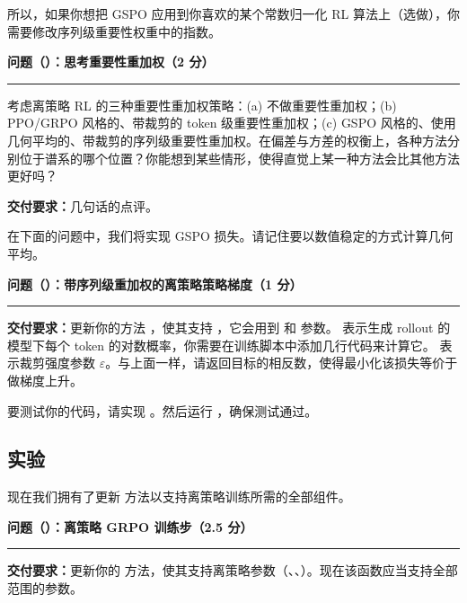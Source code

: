 所以，如果你想把 GSPO 应用到你喜欢的某个常数归一化 RL 算法上（选做），你需要修改序列级重要性权重中的指数。

\medskip
\noindent\textbf{问题（）：思考重要性重加权（2 分）}
\par\nobreak\smallskip\hrule\nobreak\medskip

考虑离策略 RL 的三种重要性重加权策略：(a) 不做重要性重加权；(b) PPO/GRPO 风格的、带裁剪的 token 级重要性重加权；(c) GSPO 风格的、使用几何平均的、带裁剪的序列级重要性重加权。在偏差与方差的权衡上，各种方法分别位于谱系的哪个位置？你能想到某些情形，使得直觉上某一种方法会比其他方法更好吗？

\textbf{交付要求：}几句话的点评。

在下面的问题中，我们将实现 GSPO 损失。请记住要以数值稳定的方式计算几何平均。

\medskip
\noindent\textbf{问题（）：带序列级重加权的离策略策略梯度（1 分）}
\par\nobreak\smallskip\hrule\nobreak\medskip

\textbf{交付要求：}更新你的方法 ，使其支持 ，它会用到  和  参数。 表示生成 rollout 的模型下每个 token 的对数概率，你需要在训练脚本中添加几行代码来计算它。 表示裁剪强度参数 $\varepsilon$。与上面一样，请返回目标的相反数，使得最小化该损失等价于做梯度上升。

要测试你的代码，请实现 。然后运行 ，确保测试通过。

\subsection{实验}

现在我们拥有了更新  方法以支持离策略训练所需的全部组件。

\medskip
\noindent\textbf{问题（）：离策略 GRPO 训练步（2.5 分）}
\par\nobreak\smallskip\hrule\nobreak\medskip

\textbf{交付要求：}更新你的  方法，使其支持离策略参数（、、）。现在该函数应当支持全部范围的参数。

